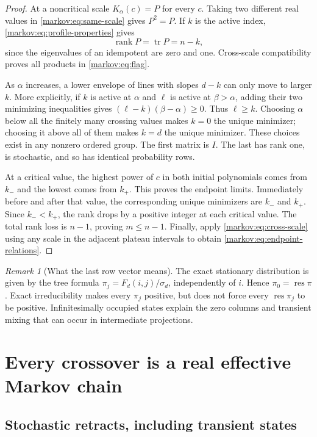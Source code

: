 \documentclass[11pt]{article}
\numberwithin{equation}{section}
\theoremstyle{definition}
\theoremstyle{remark}
\newtheorem{remark}[theorem]{Remark}
\newcommand{\res}{\operatorname{res}}
\newcommand{\rank}{\operatorname{rank}}
\newcommand{\tr}{\operatorname{tr}}
\begin{document}
\begin{proof}
At a noncritical scale $K_\alpha(c)=P$ for every $c$. Taking two different real
values in \eqref{markov:eq:same-scale} gives $P^2=P$. If $k$ is the active index,
\eqref{markov:eq:profile-properties} gives
\[
 \rank P=\tr P=n-k,
\]
since the eigenvalues of an idempotent are zero and one. Cross-scale
compatibility proves all products in \eqref{markov:eq:flag}.

As $\alpha$ increases, a lower envelope of lines with slopes $d-k$ can only move
to larger $k$. More explicitly, if $k$ is active at $\alpha$ and $\ell$ is active
at $\beta>\alpha$, adding their two minimizing inequalities gives
$(\ell-k)(\beta-\alpha)\ge0$. Thus $\ell\ge k$.
Choosing $\alpha$ below all the finitely many crossing values makes $k=0$ the
unique minimizer; choosing it above all of them makes $k=d$ the unique minimizer.
These choices exist in any nonzero ordered group. The first matrix is $I$. The
last has rank one, is stochastic, and so has identical probability rows.

At a critical value, the highest power of $c$ in both initial polynomials comes
from $k_-$ and the lowest comes from $k_+$. This proves the endpoint limits.
Immediately before and after that value, the corresponding unique minimizers
are $k_-$ and $k_+$. Since $k_-<k_+$, the rank drops by a positive integer at
each critical value. The total rank loss is $n-1$, proving $m\le n-1$.
Finally, apply \eqref{markov:eq:cross-scale} using any scale in the adjacent plateau
intervals to obtain \eqref{markov:eq:endpoint-relations}.
\end{proof}

\begin{remark}[What the last row vector means]
The exact stationary distribution is given by the tree formula
$\pi_j=F_d(i,j)/\sigma_d$, independently of $i$. Hence $\pi_0=\res\pi$.
Exact irreducibility makes every $\pi_j$ positive, but does not force every
$\res\pi_j$ to be positive. Infinitesimally occupied states explain the zero
columns and transient mixing that can occur in intermediate projections.
\end{remark}

\section{Every crossover is a real effective Markov chain}\label{markov:sec:effective}

\subsection{Stochastic retracts, including transient states}
\end{document}
